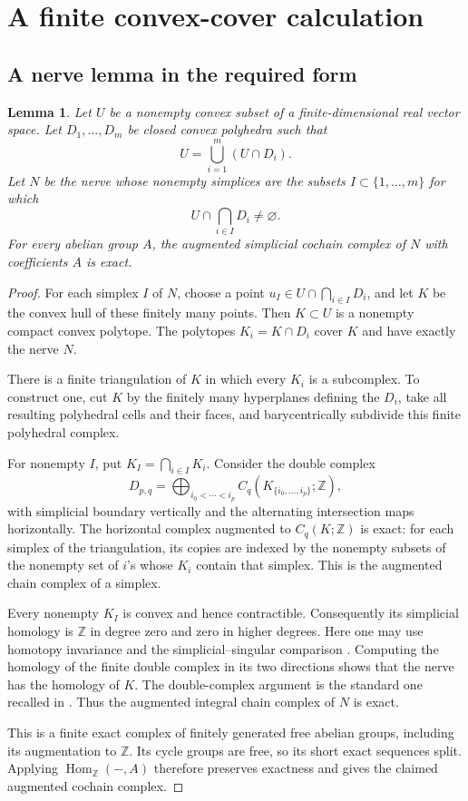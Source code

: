 \documentclass[11pt]{article}
\newtheorem{lemma}[theorem]{Lemma}
\theoremstyle{definition}
\theoremstyle{remark}
\DeclareMathOperator{\Hom}{Hom}
\newcommand{\ZZ}{\mathbb Z}
\begin{document}
\section{A finite convex-cover calculation}


\subsection{A nerve lemma in the required form}

\begin{lemma}\label{lem:convex-nerve}
Let \(U\) be a nonempty convex subset of a finite-dimensional real
vector space. Let \(D_1,\ldots,D_m\) be closed convex polyhedra such
that
\[
U=\bigcup_{i=1}^m(U\cap D_i).
\]
Let \(N\) be the nerve whose nonempty simplices are the subsets
\(I\subset\{1,\ldots,m\}\) for which
\[
U\cap\bigcap_{i\in I}D_i\ne\varnothing.
\]
For every abelian group \(A\), the augmented simplicial cochain
complex of \(N\) with coefficients \(A\) is exact.
\end{lemma}

\begin{proof}
For each simplex \(I\) of \(N\), choose a point
\(u_I\in U\cap\bigcap_{i\in I}D_i\), and let \(K\) be the convex hull
of these finitely many points. Then \(K\subset U\) is a nonempty
compact convex polytope. The polytopes \(K_i=K\cap D_i\) cover \(K\)
and have exactly the nerve \(N\).

There is a finite triangulation of \(K\) in which every \(K_i\) is
a subcomplex. To construct one, cut \(K\) by the finitely many
hyperplanes defining the \(D_i\), take all resulting polyhedral
cells and their faces, and barycentrically subdivide this finite
polyhedral complex.

For nonempty \(I\), put \(K_I=\bigcap_{i\in I}K_i\). Consider the
double complex
\[
D_{p,q}=
\bigoplus_{i_0<\cdots<i_p}
C_q(K_{\{i_0,\ldots,i_p\}};\ZZ),
\]
with simplicial boundary vertically and the alternating
intersection maps horizontally. The horizontal complex augmented
to \(C_q(K;\ZZ)\) is exact: for each simplex of the triangulation,
its copies are indexed by the nonempty subsets of the nonempty
set of \(i\)'s whose \(K_i\) contain that simplex. This is the
augmented chain complex of a simplex.

Every nonempty \(K_I\) is convex and hence contractible.
Consequently its simplicial homology is \(\ZZ\) in degree zero
and zero in higher degrees. Here one may use homotopy invariance
and the simplicial--singular comparison
\cite[Theorems~2.10 and~2.27]{Hatcher}.
Computing the homology of the finite double complex in its two
directions shows that the nerve has the homology of \(K\).
The double-complex argument is the standard one recalled in
\cite[Tag~012X]{Stacks}.
Thus the augmented integral chain complex of \(N\) is exact.

This is a finite exact complex of finitely generated free abelian
groups, including its augmentation to \(\ZZ\). Its cycle groups
are free, so its short exact sequences split. Applying
\(\Hom_{\ZZ}(-,A)\) therefore preserves exactness and gives the
claimed augmented cochain complex.
\end{proof}
\end{document}
